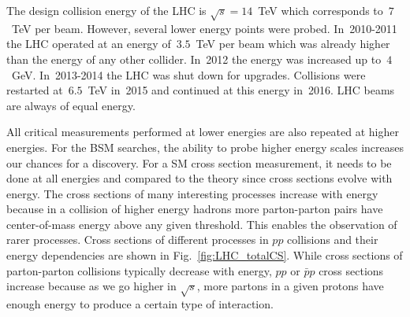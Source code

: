 


The design collision energy of the LHC is $\sqrt{s}=14$~TeV which corresponds to~$7$~TeV per beam. However, several lower energy points were probed. In~2010-2011 the LHC operated at an energy of~$3.5$~TeV per beam which was already higher than the energy of any other collider. In~2012 the energy was increased up to~$4$~GeV. In~2013-2014 the LHC was shut down for upgrades. Collisions were restarted at~$6.5$~TeV in~2015 and continued at this energy in~2016. LHC beams are always of equal energy.

All critical measurements performed at lower energies are also repeated at higher energies. For the BSM searches, the ability to probe higher energy scales increases our chances for a discovery. For a SM cross section measurement, it needs to be done at all energies and compared to the theory since cross sections evolve with energy. The cross sections of many interesting processes increase with energy because in a collision of higher energy hadrons more parton-parton pairs have center-of-mass energy above any given threshold. This enables the observation of rarer processes. Cross sections of different processes in $pp$ collisions and their energy dependencies are shown in Fig.~\ref{fig:LHC_totalCS}. While cross sections of parton-parton collisions typically decrease with energy, $pp$ or $\bar{p}p$ cross sections increase because as we go higher in $\sqrt{s}$, more partons in a given protons have enough energy to produce a certain type of interaction.  

